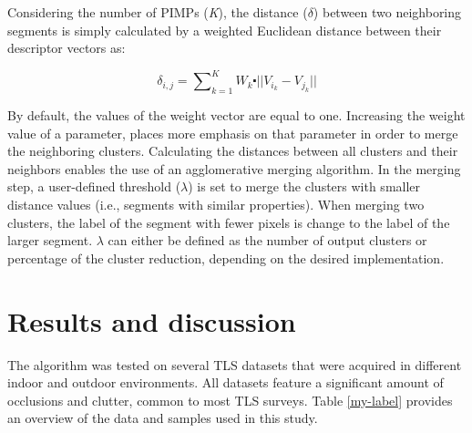 \documentclass[final,3p,times,twocolumn,authoryear]{elsarticle}
\begin{document}
Considering the number of PIMPs  (\textit{K}), the distance ($\delta$) between two neighboring segments is simply calculated by a weighted Euclidean distance between their descriptor vectors as: 

\begin{equation}
\delta_{i,j}=\sum\nolimits_{k=1}^{K}{{{W}_{k}}}\centerdot ||{{V}_{{{i}_{k}}}}-{{V}_{{{j}_{k}}}}|| 
\end{equation}

By default, the values of the weight vector are equal to one. Increasing the weight value of a parameter, places more emphasis on that parameter in order to merge the neighboring clusters. 
Calculating the distances between all clusters and their neighbors enables the use of an agglomerative merging algorithm. In the merging step, a user-defined threshold ($\lambda$) is set to merge the clusters with smaller distance values (i.e., segments with similar properties). When merging two clusters, the label of the segment with fewer pixels is change to the label of the larger segment. $\lambda$ can either be defined as the number of output clusters or percentage of the cluster reduction, depending on the desired implementation.

\section{Results and discussion}
\label{seg:result}

The algorithm was tested on several TLS datasets that were acquired in different indoor and outdoor environments. All datasets feature a significant amount of occlusions and clutter, common to most TLS surveys. Table \ref{my-label} provides an overview of the data and samples used in this study.
\end{document}
